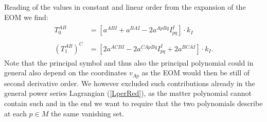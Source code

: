 Reading of the values in constant and linear order from the expansion of the EOM we find:
\begin{align}
    \begin{aligned}
    T_0^{AB} &= \left [a^{ABI} + a^{BAI} - 2 a^{ApBq}I_{pq}^I  \right ] \cdot k_I\\
    \\
    (T_1^{AB})^C &= \left [2a^{ACBI} -2a^{CApBq}I_{pq}^I + 2a^{BCAI} \right ] \cdot k_I. 
    \end{aligned}
\end{align}
%
%
%
%
%
%
%
Note that the principal symbol and thus also the principal polynomial could in general also depend on the coordinates $v_{Ap}$ as the EOM would then be still of second derivative order. We however excluded such contributions already in the general power series Lagrangian (\ref{LperRed}),  as the matter polynomial cannot contain such and in the end we want to require that the two polynomials describe at each $p \in M$ the same vanishing set. 

